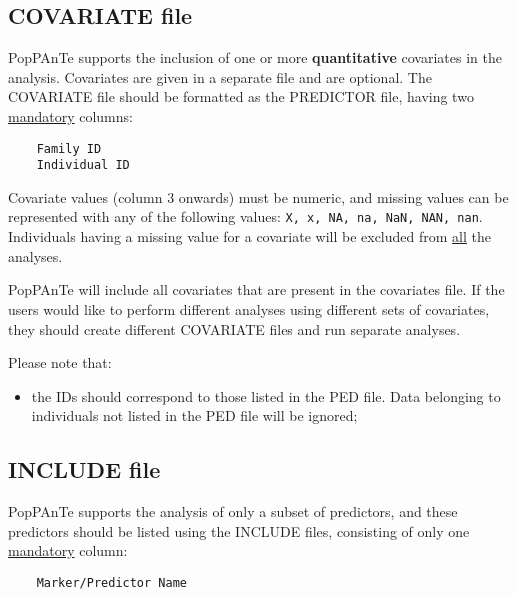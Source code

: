 \documentclass[a4paper,9pt]{article}
\newcommand{\minusitem}{\item[-]}
\begin{document}
\subsection{COVARIATE file}
\label{sec:covariatefile}

PopPAnTe supports the inclusion of one or more \textbf{quantitative} covariates in the analysis. Covariates are given in a separate file and are optional.
The COVARIATE file should be formatted as the PREDICTOR file, having two \underline{mandatory} columns:

\begin{Verbatim}
	Family ID
	Individual ID
\end{Verbatim}

\noindent
Covariate values (column 3 onwards) must be numeric, and missing values can be represented with any of the following values: \texttt{X, x, NA, na, NaN, NAN, nan}.  Individuals having a missing value for a covariate will be excluded from \underline{all} the analyses.

\noindent
PopPAnTe will include all covariates that are present in the covariates file. If the users would like to perform different analyses using different sets of covariates, they should create different COVARIATE files and run separate analyses.

\vspace{0.3cm}

\noindent
Please note that:
\begin{itemize}
	\setlength{\itemsep}{-3pt}
	\minusitem the IDs should correspond to those listed in the PED file. Data belonging to individuals not listed in the PED file will be ignored;
\end{itemize}


\subsection{INCLUDE file}
PopPAnTe supports the analysis of only a subset of predictors, and these predictors should be listed using the INCLUDE files, consisting of only one \underline{mandatory} column:

\begin{Verbatim}
	Marker/Predictor Name
\end{Verbatim}
\end{document}
